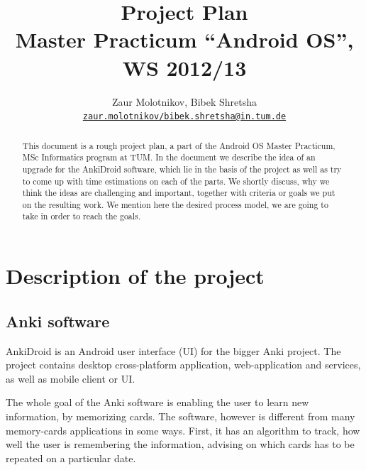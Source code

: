 \documentclass[a4paper,11pt,twoside]{article}
\begin{document}

\title{Project Plan\\
{\normalsize Master Practicum ``Android OS'', WS 2012/13}}


\author{%
  Zaur Molotnikov, Bibek Shretsha\\%
  \texttt{\url{zaur.molotnikov/bibek.shretsha@in.tum.de}}%
}



\maketitle



\pagebreak


\begin{abstract}
This document is a rough project plan, a part of the Android OS Master Practicum, MSc Informatics program at TUM.
In the document we describe the idea of an upgrade for the AnkiDroid software, 
which lie in the basis of the project as well as try to come up with time estimations on each of the parts.
We shortly discuss, why we think the ideas are challenging and important, together with criteria or goals we put on the 
resulting work. We mention here the desired process model, we are going to take in order to reach the goals.
\end{abstract}

\pagebreak

\tableofcontents

\pagebreak

\section{Description of the project}
\label{sec:intro}
\subsection{Anki software}
AnkiDroid is an Android user interface (UI) for the bigger Anki project. The project contains desktop cross-platform 
application, web-application and services, as well as mobile client or UI. 

The whole goal of the Anki software is enabling the user to learn new information, by memorizing cards. The software,
however is different from many memory-cards applications in some ways. First, it has an algorithm to track, how well
the user is remembering the information, advising on which cards has to be repeated on a particular date.
\end{document}
